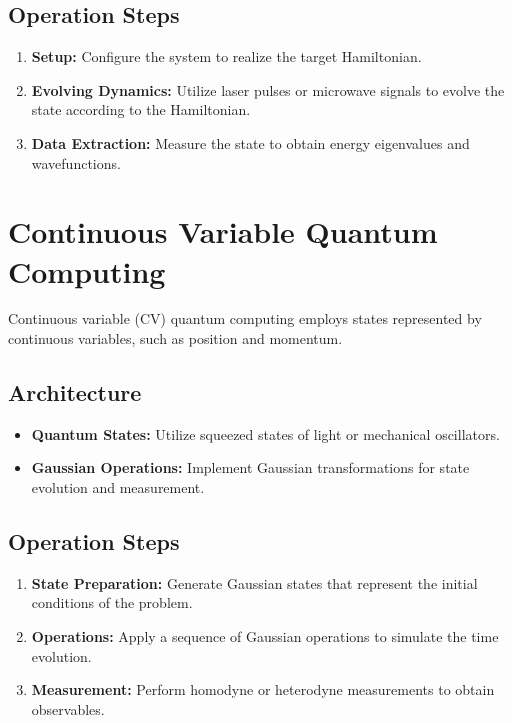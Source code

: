 \documentclass{article}
\begin{document}
\subsection{Operation Steps}
\begin{enumerate}
    \item \textbf{Setup:} Configure the system to realize the target Hamiltonian.
    \item \textbf{Evolving Dynamics:} Utilize laser pulses or microwave signals to evolve the state according to the Hamiltonian.
    \item \textbf{Data Extraction:} Measure the state to obtain energy eigenvalues and wavefunctions.
\end{enumerate}

\section{Continuous Variable Quantum Computing}

Continuous variable (CV) quantum computing employs states represented by continuous variables, such as position and momentum.

\subsection{Architecture}
\begin{itemize}
    \item \textbf{Quantum States:} Utilize squeezed states of light or mechanical oscillators.
    \item \textbf{Gaussian Operations:} Implement Gaussian transformations for state evolution and measurement.
\end{itemize}

\subsection{Operation Steps}
\begin{enumerate}
    \item \textbf{State Preparation:} Generate Gaussian states that represent the initial conditions of the problem.
    \item \textbf{Operations:} Apply a sequence of Gaussian operations to simulate the time evolution.
    \item \textbf{Measurement:} Perform homodyne or heterodyne measurements to obtain observables.
\end{enumerate}
\end{document}
